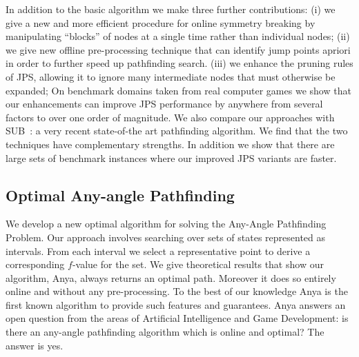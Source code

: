 In addition to the basic algorithm we make three further contributions: (i) we
give a new and more efficient procedure for online symmetry breaking by
manipulating ``blocks'' of nodes at a single time rather than individual
nodes; (ii) we give new offline pre-processing technique that can identify
jump points apriori in order to further speed up pathfinding search.  (iii) we
enhance the pruning rules of JPS, allowing it to ignore many intermediate
nodes that must otherwise be expanded; On benchmark domains taken from real
computer games we show that our enhancements can improve JPS performance by
anywhere from several factors to over one order of magnitude. We also compare
our approaches with SUB~\citep{urasKH13}: a very recent state-of-the art
pathfinding algorithm. We find that the two techniques have complementary
strengths. In addition we show that there are large sets of benchmark
instances where our improved JPS variants are faster.

\subsection{Optimal Any-angle Pathfinding}
\label{cha::intro::contributions::anya}
We develop a new optimal algorithm for solving the Any-Angle Pathfinding
Problem.  Our approach involves searching over sets of states represented as
intervals. From each interval we select a representative point to derive a
corresponding $f$-value for the set.  We give theoretical results that show
our algorithm, Anya, always returns an optimal path. Moreover it does so
entirely online and without any pre-processing. To the best of our knowledge
Anya is the first known algorithm to provide such features and guarantees.
Anya answers an open question from the areas of Artificial Intelligence and
Game Development: is there an any-angle pathfinding algorithm which is online
and optimal?  The answer is yes.

